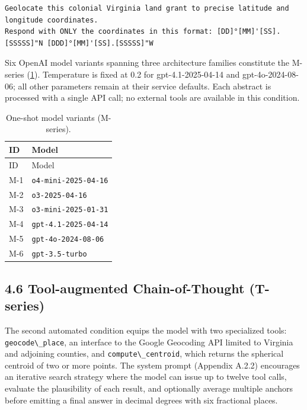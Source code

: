 \begin{lstlisting}
Geolocate this colonial Virginia land grant to precise latitude and longitude coordinates.
Respond with ONLY the coordinates in this format: [DD]°[MM]'[SS].[SSSSS]"N [DDD]°[MM]'[SS].[SSSSS]"W
\end{lstlisting}

Six OpenAI model variants spanning three architecture families
constitute the M-series (\ref{tbl:mmodels}). Temperature is fixed at 0.2
for gpt-4.1-2025-04-14 and gpt-4o-2024-08-06; all other parameters
remain at their service defaults. Each abstract is processed with a
single API call; no external tools are available in this condition.

\begin{longtable}[]{@{}ll@{}}
\caption{\label{tbl:mmodels}One-shot model variants
(M-series).}\tabularnewline
\toprule\noalign{}
ID & Model \\
\midrule\noalign{}
\endfirsthead
\toprule\noalign{}
ID & Model \\
\midrule\noalign{}
\endhead
\bottomrule\noalign{}
\endlastfoot
M-1 & \passthrough{\lstinline!o4-mini-2025-04-16!} \\
M-2 & \passthrough{\lstinline!o3-2025-04-16!} \\
M-3 & \passthrough{\lstinline!o3-mini-2025-01-31!} \\
M-4 & \passthrough{\lstinline!gpt-4.1-2025-04-14!} \\
M-5 & \passthrough{\lstinline!gpt-4o-2024-08-06!} \\
M-6 & \passthrough{\lstinline!gpt-3.5-turbo!} \\
\end{longtable}

\subsection{4.6 Tool-augmented Chain-of-Thought
(T-series)}\label{tool-augmented-chain-of-thought-t-series}

The second automated condition equips the model with two specialized
tools: \passthrough{\lstinline!geocode\_place!}, an interface to the
Google Geocoding API limited to Virginia and adjoining counties, and
\passthrough{\lstinline!compute\_centroid!}, which returns the spherical
centroid of two or more points. The system prompt (Appendix A.2.2)
encourages an iterative search strategy where the model can issue up to
twelve tool calls, evaluate the plausibility of each result, and
optionally average multiple anchors before emitting a final answer in
decimal degrees with six fractional places.

